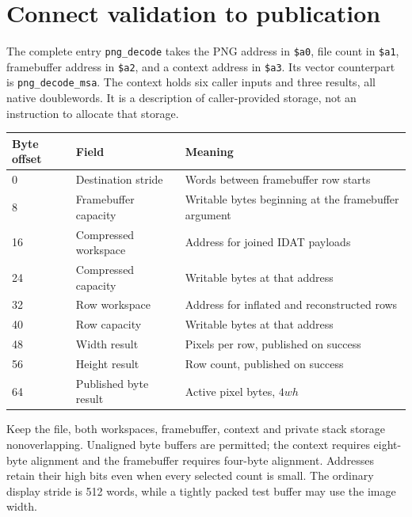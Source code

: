 \section{Connect validation to publication}
The complete entry \texttt{png\_decode} takes the PNG address in \texttt{\$a0}, file
count in \texttt{\$a1}, framebuffer address in \texttt{\$a2}, and a context address
in \texttt{\$a3}. Its vector counterpart is \texttt{png\_decode\_msa}. The context
holds six caller inputs and three results, all native doublewords. It is a description
of caller-provided storage, not an instruction to allocate that storage.

\begin{longtable}{p{22mm}p{44mm}p{84mm}}
  \toprule Byte offset & Field                 & Meaning                                              \\\midrule
  0                    & Destination stride    & Words between framebuffer row starts                 \\
  8                    & Framebuffer capacity  & Writable bytes beginning at the framebuffer argument \\
  16                   & Compressed workspace  & Address for joined IDAT payloads                     \\
  24                   & Compressed capacity   & Writable bytes at that address                       \\
  32                   & Row workspace         & Address for inflated and reconstructed rows          \\
  40                   & Row capacity          & Writable bytes at that address                       \\
  48                   & Width result          & Pixels per row, published on success                 \\
  56                   & Height result         & Row count, published on success                      \\
  64                   & Published byte result & Active pixel bytes, $4wh$                            \\\bottomrule
\end{longtable}
Keep the file, both workspaces, framebuffer, context and private stack storage
nonoverlapping. Unaligned byte buffers are permitted; the context requires eight-byte
alignment and the framebuffer requires four-byte alignment. Addresses retain their
high bits even when every selected count is small. The ordinary display stride is
512 words, while a tightly packed test buffer may use the image width.

